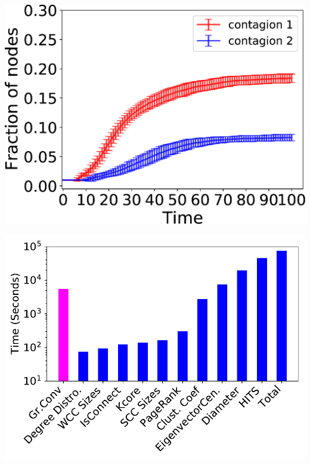 \documentclass[landscape,paperwidth=70in,paperheight=46in,fontscale=0.225]{baposter} %
\begin{document}
\begin{poster}
{\begin{minipage}{0.45\linewidth}
\end{minipage}
\hfill
\begin{minipage}{0.45\linewidth}
\includegraphics[scale=0.27]{figures/danville_no_interaction_100ns_fraction_cum_errorbar.eps} 
\end{minipage}
\begin{minipage}{0.45\linewidth}
\includegraphics[scale=0.27]{figures/g4_timing.pdf} 
\end{minipage}
\hfill
\begin{minipage}{0.45\linewidth}

\end{minipage}}
\end{poster}
\end{document}
